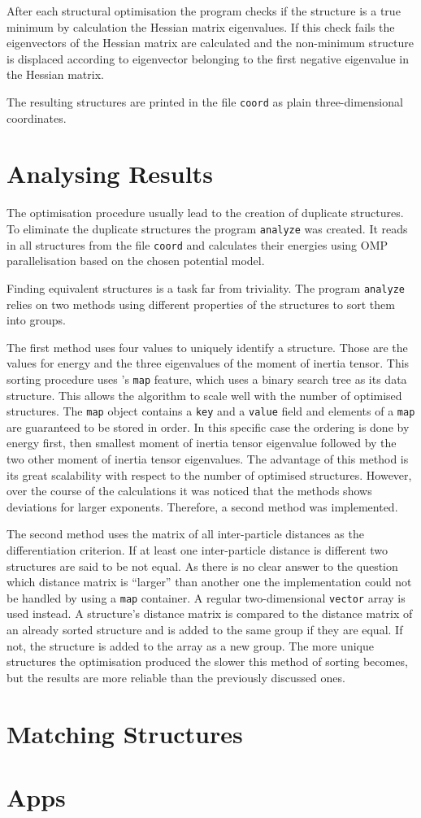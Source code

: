 After each structural optimisation the program checks if the structure is a
true minimum by calculation the Hessian matrix eigenvalues. If this check fails
the eigenvectors of the Hessian matrix are calculated and the non-minimum
structure is displaced according to eigenvector belonging to the first negative
eigenvalue in the Hessian matrix.

The resulting structures are printed in the file \verb|coord| as plain
three-dimensional coordinates.

\section{Analysing Results}
\label{sec:analysingresults}

The optimisation procedure usually lead to the creation of duplicate
structures. To eliminate the duplicate structures the program \verb|analyze|
was created. It reads in all structures from the file \verb|coord| and
calculates their energies using \ac{OMP} parallelisation based on the chosen
potential model.

Finding equivalent structures is a task far from triviality. The program
\verb|analyze| relies on two methods using different properties of the
structures to sort them into groups.

The first method uses four values to uniquely identify a structure. Those are
the values for energy and the three eigenvalues of the moment of inertia
tensor. This sorting procedure uses \Cpp's \verb|map| feature, which uses a
binary search tree as its data structure. This allows the algorithm to scale
well with the number of optimised structures. The \Cpp \verb|map| object
contains a \verb|key| and a \verb|value| field and elements of a \verb|map| are
guaranteed to be stored in
order.\autocite{Cormen_IntroductionAlgorithms3rd_2009} In this specific case
the ordering is done by energy first, then smallest moment of inertia tensor
eigenvalue followed by the two other moment of inertia tensor eigenvalues. The
advantage of this method is its great scalability with respect to the number of
optimised structures.  However, over the course of the calculations it was
noticed that the methods shows deviations for larger exponents. Therefore, a
second method was implemented.

The second method uses the matrix of all inter-particle distances as the
differentiation criterion. If at least one inter-particle distance is different
two structures are said to be not equal. As there is no clear answer to the
question which distance matrix is ``larger'' than another one the
implementation could not be handled by using a \verb|map| container. A regular
two-dimensional \verb|vector| array is used instead. A structure's distance
matrix is compared to the distance matrix of an already sorted structure and is
added to the same group if they are equal. If not, the structure is added to
the array as a new group. The more unique structures the optimisation produced
the slower this method of sorting becomes, but the results are more reliable
than the previously discussed ones.

\section{Matching Structures}
\label{sec:matchingstructures}

\section{Apps}
\label{sec:apps}
